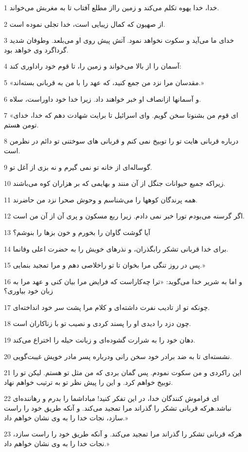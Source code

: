 \par 1 خدا، خدا یهوه تکلم می‌کند و زمین رااز مطلع آفتاب تا به مغربش می‌خواند.
\par 2 از صهیون که کمال زیبایی است، خدا تجلی نموده است.
\par 3 خدای ما می‌آید و سکوت نخواهد نمود. آتش پیش روی او می‌بلعد. وطوفان شدید گرداگرد وی خواهد بود.
\par 4 آسمان را از بالا می‌خواند و زمین را، تا قوم خود راداوری کند:
\par 5 «مقدسان مرا نزد من جمع کنید، که عهد را با من به قربانی بسته‌اند.»
\par 6 و آسمانها ازانصاف او خبر خواهند داد. زیرا خدا خود داوراست، سلاه.
\par 7 «ای قوم من بشنوتا سخن گویم. و‌ای اسرائیل تا برایت شهادت دهم که خدا، خدای تومن هستم.
\par 8 درباره قربانی هایت تو را توبیخ نمی کنم و قربانی های سوختنی تو دائم در نظرمن است.
\par 9 گوساله‌ای از خانه تو نمی گیرم و نه بزی از آغل تو.
\par 10 زیراکه جمیع حیوانات جنگل از آن منند و بهایمی که بر هزاران کوه می‌باشند.
\par 11 همه پرندگان کوهها را می‌شناسم و وحوش صحرا نزد من حاضرند.
\par 12 اگر گرسنه می‌بودم تورا خبر نمی دادم. زیرا ربع مسکون و پری آن از آن من است.
\par 13 آیا گوشت گاوان را بخورم و خون بزها را بنوشم؟
\par 14 برای خدا قربانی تشکر رابگذران، و نذرهای خویش را به حضرت اعلی وفانما.
\par 15 پس در روز تنگی مرا بخوان تا تو راخلاصی دهم و مرا تمجید بنمایی.»
\par 16 و اما به شریر خدا می‌گوید: «ترا چه‌کاراست که فرایض مرا بیان کنی و عهد مرا به زبان خود بیاوری؟
\par 17 چونکه تو از تادیب نفرت داشته‌ای و کلام مرا پشت سر خود انداخته‌ای.
\par 18 چون دزد را دیدی او را پسند کردی و نصیب تو با زناکاران است.
\par 19 دهان خود را به شرارت گشوده‌ای و زبانت حیله را اختراع می‌کند.
\par 20 نشسته‌ای تا به ضد برادر خود سخن رانی ودرباره پسر مادر خویش غیبت‌گویی.
\par 21 این راکردی و من سکوت نمودم. پس گمان بردی که من مثل تو هستم. لیکن تو را توبیخ خواهم کرد. و این را پیش نظر تو به ترتیب خواهم نهاد.
\par 22 ‌ای فراموش کنندگان خدا، در این تفکر کنید! مباداشما را بدرم و رهاننده‌ای نباشد.هر‌که قربانی تشکر را گذراند مرا تمجید می‌کند. و آنکه طریق خود را راست سازد، نجات خدا را به وی نشان خواهم داد.»
\par 23 هر‌که قربانی تشکر را گذراند مرا تمجید می‌کند. و آنکه طریق خود را راست سازد، نجات خدا را به وی نشان خواهم داد.»
 
